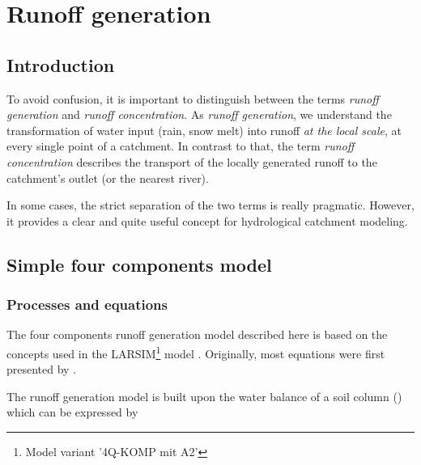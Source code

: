 \chapter{Runoff generation} \label{chap:runGen}
\renewcommand{\tabdir}{chapters/part_processes/runoffGeneration/tab}
\renewcommand{\figdir}{chapters/part_processes/runoffGeneration/fig}

\section{Introduction} \label{sec:runGen_intro}

To avoid confusion, it is important to distinguish between the terms \emph{runoff generation} and \emph{runoff concentration}. As \emph{runoff generation}, we understand the transformation of water input (rain, snow melt) into runoff \emph{at the local scale}, \ie{} at every single point of a catchment. In contrast to that, the term \emph{runoff concentration} describes the transport of the locally generated runoff to the catchment's outlet (or the nearest river).

In some cases, the strict separation of the two terms is really pragmatic. However, it provides a clear and quite useful concept for hydrological catchment modeling.


\section{Simple four components model} \label{sec:runGen4comp}


\subsection{Processes and equations} \label{sec:runGen4comp_processes}

The four components runoff generation model described here is based on the concepts used in the LARSIM\footnote{Model variant '4Q-KOMP mit A2'} model \citet{Ludwig2006}. Originally, most equations were first presented by \citet{Todini1996}.

The runoff generation model is built upon the water balance of a soil column () which can be expressed by 

